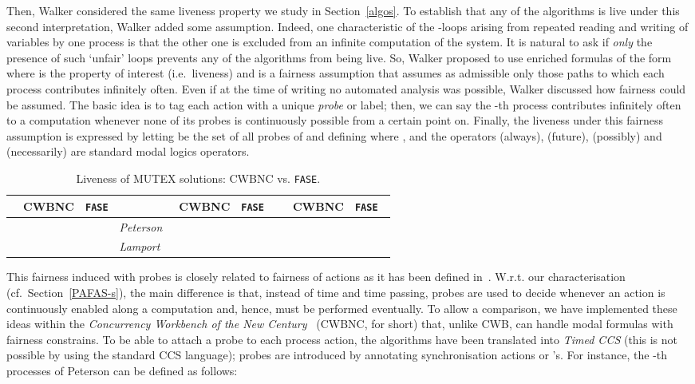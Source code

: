 \documentclass[copyright,creativecommons]{eptcs}
\newcommand{\fase}{\texttt{FASE}}
\newcommand{\checky}{\ding{51}}
\newcommand{\checkn}{\ding{55}}
\newcommand{\peterson}{{\it Peterson}}
\newcommand{\lamport}{{\it Lamport}}
\begin{document}
Then, Walker considered the same liveness property we study in
Section~\ref{algos}. To establish that any of the algorithms is live under
this second interpretation, Walker added some assumption. Indeed,
one characteristic of the -loops arising from repeated reading and
writing of variables by one process is that the other one is excluded from
an infinite computation of the system. It is natural to ask if {\em
only} the presence of such `unfair' loops prevents any of the
algorithms from being live. So, Walker proposed to use enriched formulas
of the form  where  is the property of interest (i.e.\
liveness) and  is a fairness assumption that assumes as admissible
only those paths to which each process contributes infinitely often. 
Even if at the time of writing no automated analysis was possible, Walker
discussed how fairness could be assumed. The basic idea  is to tag
each action with a unique {\em probe} or label; then, we can say the -th
process  contributes infinitely often to a computation whenever
none of its probes is continuously possible from a certain point on.
Finally, the liveness under this fairness
assumption is expressed by letting  be the set of all probes of
 and defining  
where 
,
and the operators  (always),  (future),  (possibly)
and  (necessarily) are standard modal logics operators.

\begin{table}
\centering
\small
\begin{tabular}{l c c l c c l c c}
 & CWBNC & \fase & &  CWBNC & \fase\  & &  CWBNC & \fase\  \\ \hline
\midrule
 & \checkn\ & \checky\ & \peterson\ & \checkn\ & \checky\
&  & \checkn\ & \checkn\ \\
 & \checkn\ & \checkn\ & \lamport\ & \checkn\ & \checkn\ \\
\midrule
\end{tabular}
\caption{Liveness of MUTEX solutions: CWBNC vs. \fase.}
\label{tab:comparing2}
\end{table}

This fairness induced with probes is closely related to fairness of actions
as it has been defined in~\cite{CostaS84,CostaS87}. W.r.t. our
characterisation (cf.\ Section~\ref{PAFAS-s}),  the  main difference is
that, instead of time and time passing, probes are used to decide whenever
an action is continuously enabled along a computation and, hence, must be
performed eventually. To allow a comparison, we have implemented these
ideas within the {\em Concurrency Workbench of the New
Century}~\cite{CLS00} (CWBNC, for short) that, unlike CWB, can handle modal
formulas with fairness constrains. To be able to attach a probe to each
process action, the algorithms have been translated into {\em Timed CCS}
(this is not possible by using the standard CCS language); probes are
introduced by annotating synchronisation actions or 's. For instance,
the -th processes of Peterson can be defined as follows:
\end{document}
